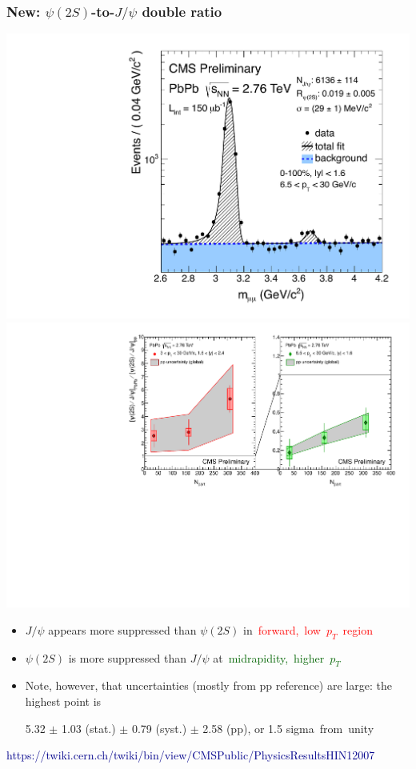 \documentclass[compress]{beamer}
\begin{document}
\begin{frame}
\frametitle{New: $\psi(2S)$-to-$J/\psi$ double ratio}

\includegraphics[height=4.2 cm]{dimuons/psi2s.pdf}
\includegraphics[height=4.2 cm]{dimuons/double_ratio_ppGlobal_midpt_slides.pdf}

\begin{itemize}
\item $J/\psi$ appears more suppressed than $\psi(2S)$ \mbox{in \textcolor{red}{forward, low $p_T$ region}\hspace{-1 cm}}
\item $\psi(2S)$ is more suppressed than $J/\psi$ \mbox{at \textcolor{darkgreen}{midrapidity, higher $p_T$}\hspace{-1 cm}}

\item Note, however, that uncertainties (mostly from pp reference) are large: the highest point is

5.32 $\pm$ 1.03 (stat.) $\pm$ 0.79 (syst.) $\pm$ 2.58 (pp), or 1.5 \mbox{sigma from unity\hspace{-1 cm}}

\end{itemize}

\scriptsize
\hfill \textcolor{darkblue}{https://twiki.cern.ch/twiki/bin/view/CMSPublic/PhysicsResultsHIN12007}
\end{frame}
\end{document}
